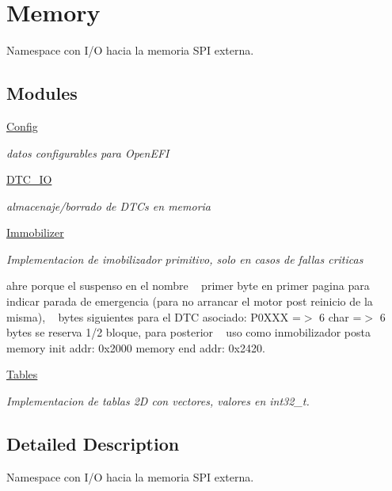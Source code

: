 \hypertarget{group__Memory}{}\section{Memory}
\label{group__Memory}


Namespace con I/O hacia la memoria S\+PI externa.  


\subsection*{Modules}
\begin{DoxyCompactItemize}
\item 
\hyperlink{group__Config}{Config}
\begin{DoxyCompactList}\small\item\em datos configurables para Open\+E\+FI \end{DoxyCompactList}\item 
\hyperlink{group__DTC__IO}{D\+T\+C\+\_\+\+IO}
\begin{DoxyCompactList}\small\item\em almacenaje/borrado de D\+TC\textquotesingle{}s en memoria \end{DoxyCompactList}\item 
\hyperlink{group__Immobilizer}{Immobilizer}
\begin{DoxyCompactList}\small\item\em Implementacion de imobilizador primitivo, solo en casos de fallas criticas 

ahre porque el suspenso en el nombre ~\newline
primer byte en primer pagina para indicar parada de emergencia (para no arrancar el motor post reinicio de la misma), ~ bytes siguientes para el D\+TC asociado\+: P0\+X\+XX =$>$ 6 char =$>$ 6 bytes se reserva 1/2 bloque, para posterior ~\newline
 uso como inmobilizador posta memory init addr\+: 0x2000 memory end addr\+: 0x2420. \end{DoxyCompactList}\item 
\hyperlink{group__Tables}{Tables}
\begin{DoxyCompactList}\small\item\em Implementacion de tablas 2D con vectores, valores en int32\+\_\+t. \end{DoxyCompactList}\end{DoxyCompactItemize}


\subsection{Detailed Description}
Namespace con I/O hacia la memoria S\+PI externa. 

